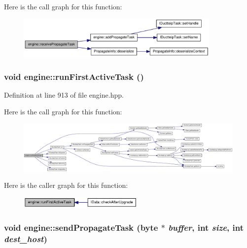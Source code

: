 Here is the call graph for this function:\nopagebreak
\begin{figure}[H]
\begin{center}
\leavevmode
\includegraphics[width=282pt]{classengine_a21127e8807bf1984daa2806e056aef9c_cgraph}
\end{center}
\end{figure}
\hypertarget{classengine_ad5b326de03b791ffb0846bbcc18d4252}{
\subsubsection[{runFirstActiveTask}]{\setlength{\rightskip}{0pt plus 5cm}void engine::runFirstActiveTask ()}}
\label{classengine_ad5b326de03b791ffb0846bbcc18d4252}


Definition at line 913 of file engine.hpp.

Here is the call graph for this function:\nopagebreak
\begin{figure}[H]
\begin{center}
\leavevmode
\includegraphics[width=420pt]{classengine_ad5b326de03b791ffb0846bbcc18d4252_cgraph}
\end{center}
\end{figure}


Here is the caller graph for this function:\nopagebreak
\begin{figure}[H]
\begin{center}
\leavevmode
\includegraphics[width=173pt]{classengine_ad5b326de03b791ffb0846bbcc18d4252_icgraph}
\end{center}
\end{figure}
\hypertarget{classengine_a8cca3e07a3c37e5f7af11da6a81f16c5}{
\subsubsection[{sendPropagateTask}]{\setlength{\rightskip}{0pt plus 5cm}void engine::sendPropagateTask ({\bf byte} $\ast$ {\em buffer}, \/  int {\em size}, \/  int {\em dest\_\-host})}}
\label{classengine_a8cca3e07a3c37e5f7af11da6a81f16c5}


